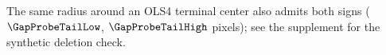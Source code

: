 The same radius around an OLS4 terminal center also admits both
signs ($\GapProbeTailLow$, $\GapProbeTailHigh$ pixels); see the
supplement for the synthetic deletion check.

